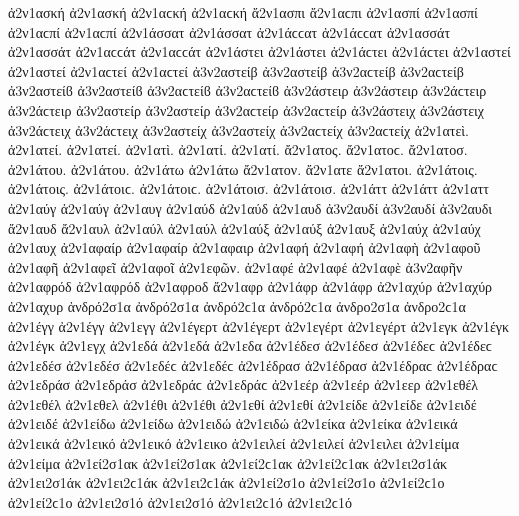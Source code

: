 {ἀ2ν1ασκή ἀ2ν1ασκή ἀ2ν1αϲκή ἀ2ν1αϲκή
ἄ2ν1ασπι ἄ2ν1αϲπι   %
ἀ2ν1ασπί ἀ2ν1ασπί ἀ2ν1αϲπί ἀ2ν1αϲπί
ἀ2ν1άσσατ ἀ2ν1άσσατ ἀ2ν1άϲϲατ ἀ2ν1άϲϲατ   %
ἀ2ν1ασσάτ ἀ2ν1ασσάτ ἀ2ν1αϲϲάτ ἀ2ν1αϲϲάτ
ἀ2ν1άστει ἀ2ν1άστει ἀ2ν1άϲτει ἀ2ν1άϲτει   %
ἀ2ν1αστεί ἀ2ν1αστεί ἀ2ν1αϲτεί ἀ2ν1αϲτεί
ἀ3ν2αστείβ ἀ3ν2αστείβ ἀ3ν2αϲτείβ ἀ3ν2αϲτείβ ἀ3ν2αστείϐ ἀ3ν2αστείϐ ἀ3ν2αϲτείϐ ἀ3ν2αϲτείϐ %
ἀ3ν2άστειρ ἀ3ν2άστειρ ἀ3ν2άϲτειρ ἀ3ν2άϲτειρ   %
ἀ3ν2αστείρ ἀ3ν2αστείρ ἀ3ν2αϲτείρ ἀ3ν2αϲτείρ
ἀ3ν2άστειχ ἀ3ν2άστειχ ἀ3ν2άϲτειχ ἀ3ν2άϲτειχ   %
ἀ3ν2αστείχ ἀ3ν2αστείχ ἀ3ν2αϲτείχ ἀ3ν2αϲτείχ
ἀ2ν1ατεὶ.   %
ἀ2ν1ατεί. ἀ2ν1ατεί.
ἀ2ν1ατὶ.   %
ἀ2ν1ατί. ἀ2ν1ατί.
ἄ2ν1ατος. ἄ2ν1ατοϲ.   %
ἄ2ν1ατοσ.
ἀ2ν1άτου. ἀ2ν1άτου.
ἀ2ν1άτω ἀ2ν1άτω
ἄ2ν1ατον.
ἄ2ν1ατε
ἄ2ν1ατοι.
ἀ2ν1άτοις. ἀ2ν1άτοις. ἀ2ν1άτοιϲ. ἀ2ν1άτοιϲ.
ἀ2ν1άτοισ. ἀ2ν1άτοισ.
ἀ2ν1άττ ἀ2ν1άττ   %
ἀ2ν1αττ
ἀ2ν1αύγ ἀ2ν1αύγ   %
ἀ2ν1αυγ
ἀ2ν1αύδ ἀ2ν1αύδ   %
ἀ2ν1αυδ
ἀ3ν2αυδί ἀ3ν2αυδί   %
ἀ3ν2αυδι
ἄ2ν1αυδ   %
ἄ2ν1αυλ   %
ἀ2ν1αύλ ἀ2ν1αύλ
ἀ2ν1αύξ ἀ2ν1αύξ   %
ἀ2ν1αυξ
ἀ2ν1αύχ ἀ2ν1αύχ   %
ἀ2ν1αυχ
ἀ2ν1αφαίρ ἀ2ν1αφαίρ   %
ἀ2ν1αφαιρ
ἀ2ν1αφή ἀ2ν1αφή   %
ἀ2ν1αφὴ
ἀ2ν1αφοῦ
ἀ2ν1αφῆ
ἀ2ν1αφεῖ
ἀ2ν1αφοῖ
ἀ2ν1εφῶν.
ἀ2ν1αφέ ἀ2ν1αφέ
ἀ2ν1αφὲ
ἀ3ν2αφῆν   %
ἀ2ν1αφρόδ ἀ2ν1αφρόδ   %
ἀ2ν1αφροδ
ἄ2ν1αφρ   %
ἀ2ν1άφρ ἀ2ν1άφρ
ἀ2ν1αχύρ ἀ2ν1αχύρ   %
ἀ2ν1αχυρ
ἀνδρό2σ1α ἀνδρό2σ1α ἀνδρό2ϲ1α ἀνδρό2ϲ1α   %
ἀνδρο2σ1α ἀνδρο2ϲ1α
ἀ2ν1έγγ ἀ2ν1έγγ   %
ἀ2ν1εγγ
ἀ2ν1έγερτ ἀ2ν1έγερτ   %
ἀ2ν1εγέρτ ἀ2ν1εγέρτ
ἀ2ν1εγκ   %
ἀ2ν1έγκ ἀ2ν1έγκ   %
ἀ2ν1εγχ   %
ἀ2ν1εδά ἀ2ν1εδά   %
ἀ2ν1εδα
ἀ2ν1έδεσ ἀ2ν1έδεσ ἀ2ν1έδεϲ ἀ2ν1έδεϲ   %
ἀ2ν1εδέσ ἀ2ν1εδέσ ἀ2ν1εδέϲ ἀ2ν1εδέϲ
ἀ2ν1έδρασ ἀ2ν1έδρασ ἀ2ν1έδραϲ ἀ2ν1έδραϲ   %
ἀ2ν1εδράσ ἀ2ν1εδράσ ἀ2ν1εδράϲ ἀ2ν1εδράϲ
ἀ2ν1εέρ ἀ2ν1εέρ   %
ἀ2ν1εερ
ἀ2ν1εθέλ ἀ2ν1εθέλ   %
ἀ2ν1εθελ
ἀ2ν1έθι ἀ2ν1έθι   %
ἀ2ν1εθί ἀ2ν1εθί
ἀ2ν1είδε ἀ2ν1είδε   %
ἀ2ν1ειδέ ἀ2ν1ειδέ
ἀ2ν1είδω ἀ2ν1είδω   %
ἀ2ν1ειδώ ἀ2ν1ειδώ
ἀ2ν1είκα ἀ2ν1είκα   %
ἀ2ν1εικά ἀ2ν1εικά
ἀ2ν1εικό ἀ2ν1εικό   %
ἀ2ν1εικο
ἀ2ν1ειλεί ἀ2ν1ειλεί   %
ἀ2ν1ειλει
ἀ2ν1είμα ἀ2ν1είμα   %
ἀ2ν1εί2σ1ακ ἀ2ν1εί2σ1ακ ἀ2ν1εί2ϲ1ακ ἀ2ν1εί2ϲ1ακ   %
ἀ2ν1ει2σ1άκ ἀ2ν1ει2σ1άκ ἀ2ν1ει2ϲ1άκ ἀ2ν1ει2ϲ1άκ
ἀ2ν1εί2σ1ο ἀ2ν1εί2σ1ο ἀ2ν1εί2ϲ1ο ἀ2ν1εί2ϲ1ο   %
ἀ2ν1ει2σ1ό ἀ2ν1ει2σ1ό ἀ2ν1ει2ϲ1ό ἀ2ν1ει2ϲ1ό
}
